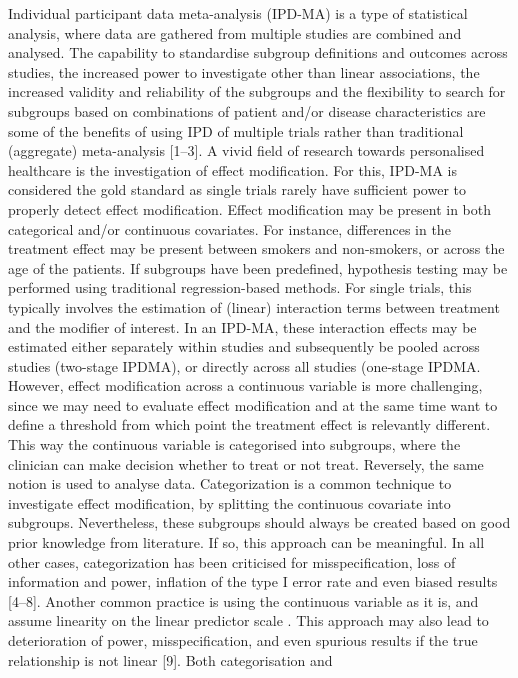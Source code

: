 \documentclass[14pt,]{article}
\begin{document}
Individual participant data meta-analysis (IPD-MA) is a type of
statistical analysis, where data are gathered from multiple studies are
combined and analysed. The capability to standardise subgroup
definitions and outcomes across studies, the increased power to
investigate other than linear associations, the increased validity and
reliability of the subgroups and the flexibility to search for subgroups
based on combinations of patient and/or disease characteristics are some
of the benefits of using IPD of multiple trials rather than traditional
(aggregate) meta-analysis {[}1--3{]}. A vivid field of research towards
personalised healthcare is the investigation of effect modification. For
this, IPD-MA is considered the gold standard as single trials rarely
have sufficient power to properly detect effect modification. Effect
modification may be present in both categorical and/or continuous
covariates. For instance, differences in the treatment effect may be
present between smokers and non-smokers, or across the age of the
patients. If subgroups have been predefined, hypothesis testing may be
performed using traditional regression-based methods. For single trials,
this typically involves the estimation of (linear) interaction terms
between treatment and the modifier of interest. In an IPD-MA, these
interaction effects may be estimated either separately within studies
and subsequently be pooled across studies (two-stage IPDMA), or directly
across all studies (one-stage IPDMA. However, effect modification across
a continuous variable is more challenging, since we may need to evaluate
effect modification and at the same time want to define a threshold from
which point the treatment effect is relevantly different. This way the
continuous variable is categorised into subgroups, where the clinician
can make decision whether to treat or not treat. Reversely, the same
notion is used to analyse data. Categorization is a common technique to
investigate effect modification, by splitting the continuous covariate
into subgroups. Nevertheless, these subgroups should always be created
based on good prior knowledge from literature. If so, this approach can
be meaningful. In all other cases, categorization has been criticised
for misspecification, loss of information and power, inflation of the
type I error rate and even biased results {[}4--8{]}. Another common
practice is using the continuous variable as it is, and assume linearity
on the linear predictor scale . This approach may also lead to
deterioration of power, misspecification, and even spurious results if
the true relationship is not linear {[}9{]}. Both categorisation and
\end{document}
